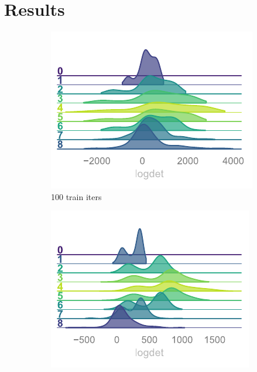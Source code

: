 \documentclass[a4paper,11pt]{article}
\begin{document}
\section{\label{sec:results}Results}
%
\begin{figure}[htpb!]
    \centering
    \begin{subfigure}{0.31\textwidth}
        \includegraphics[width=\textwidth]{assets/logdet-1.pdf}
        \caption{\label{subfig:logdet1} 100 train iters}
    \end{subfigure}
    \hfill
    \begin{subfigure}{0.31\textwidth}
        \includegraphics[width=\textwidth]{assets/logdet-2.pdf}

\end{subfigure}
\end{figure}
\end{document}
